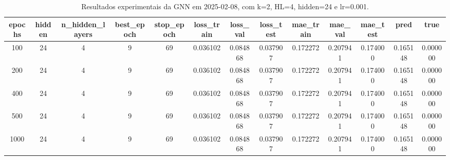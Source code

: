 \begin{table}[h]
\centering
\caption{Resultados experimentais da GNN em 2025-02-08, com k=2, HL=4, hidden=24 e lr=0.001.}
\label{tab:gnn_results_k2_hl4_h24_d20250208}
\begin{tabular}{ccccccccccccc}
\toprule
epochs & hidden & n\_hidden\_layers & best\_epoch & stop\_epoch & loss\_train & loss\_val & loss\_test & mae\_train & mae\_val & mae\_test & pred & true \\
\midrule
100 & 24 & 4 & 9 & 69 & 0.036102 & 0.084868 & 0.037907 & 0.172272 & 0.207941 & 0.174000 & 0.165148 & 0.000000 \\
200 & 24 & 4 & 9 & 69 & 0.036102 & 0.084868 & 0.037907 & 0.172272 & 0.207941 & 0.174000 & 0.165148 & 0.000000 \\
400 & 24 & 4 & 9 & 69 & 0.036102 & 0.084868 & 0.037907 & 0.172272 & 0.207941 & 0.174000 & 0.165148 & 0.000000 \\
500 & 24 & 4 & 9 & 69 & 0.036102 & 0.084868 & 0.037907 & 0.172272 & 0.207941 & 0.174000 & 0.165148 & 0.000000 \\
1000 & 24 & 4 & 9 & 69 & 0.036102 & 0.084868 & 0.037907 & 0.172272 & 0.207941 & 0.174000 & 0.165148 & 0.000000 \\
\bottomrule
\end{tabular}
\end{table}
